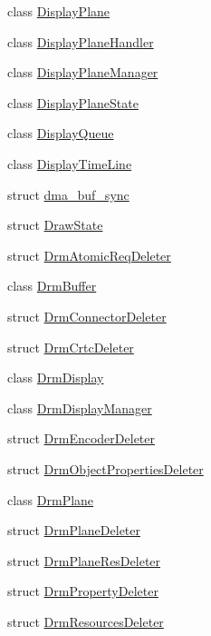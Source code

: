 \begin{DoxyCompactItemize}
class \mbox{\hyperlink{classhwcomposer_1_1DisplayPlane}{Display\+Plane}}
\item 
class \mbox{\hyperlink{classhwcomposer_1_1DisplayPlaneHandler}{Display\+Plane\+Handler}}
\item 
class \mbox{\hyperlink{classhwcomposer_1_1DisplayPlaneManager}{Display\+Plane\+Manager}}
\item 
class \mbox{\hyperlink{classhwcomposer_1_1DisplayPlaneState}{Display\+Plane\+State}}
\item 
class \mbox{\hyperlink{classhwcomposer_1_1DisplayQueue}{Display\+Queue}}
\item 
class \mbox{\hyperlink{classhwcomposer_1_1DisplayTimeLine}{Display\+Time\+Line}}
\item 
struct \mbox{\hyperlink{structhwcomposer_1_1dma__buf__sync}{dma\+\_\+buf\+\_\+sync}}
\item 
struct \mbox{\hyperlink{structhwcomposer_1_1DrawState}{Draw\+State}}
\item 
struct \mbox{\hyperlink{structhwcomposer_1_1DrmAtomicReqDeleter}{Drm\+Atomic\+Req\+Deleter}}
\item 
class \mbox{\hyperlink{classhwcomposer_1_1DrmBuffer}{Drm\+Buffer}}
\item 
struct \mbox{\hyperlink{structhwcomposer_1_1DrmConnectorDeleter}{Drm\+Connector\+Deleter}}
\item 
struct \mbox{\hyperlink{structhwcomposer_1_1DrmCrtcDeleter}{Drm\+Crtc\+Deleter}}
\item 
class \mbox{\hyperlink{classhwcomposer_1_1DrmDisplay}{Drm\+Display}}
\item 
class \mbox{\hyperlink{classhwcomposer_1_1DrmDisplayManager}{Drm\+Display\+Manager}}
\item 
struct \mbox{\hyperlink{structhwcomposer_1_1DrmEncoderDeleter}{Drm\+Encoder\+Deleter}}
\item 
struct \mbox{\hyperlink{structhwcomposer_1_1DrmObjectPropertiesDeleter}{Drm\+Object\+Properties\+Deleter}}
\item 
class \mbox{\hyperlink{classhwcomposer_1_1DrmPlane}{Drm\+Plane}}
\item 
struct \mbox{\hyperlink{structhwcomposer_1_1DrmPlaneDeleter}{Drm\+Plane\+Deleter}}
\item 
struct \mbox{\hyperlink{structhwcomposer_1_1DrmPlaneResDeleter}{Drm\+Plane\+Res\+Deleter}}
\item 
struct \mbox{\hyperlink{structhwcomposer_1_1DrmPropertyDeleter}{Drm\+Property\+Deleter}}
\item 
struct \mbox{\hyperlink{structhwcomposer_1_1DrmResourcesDeleter}{Drm\+Resources\+Deleter}}

\end{DoxyCompactItemize}
